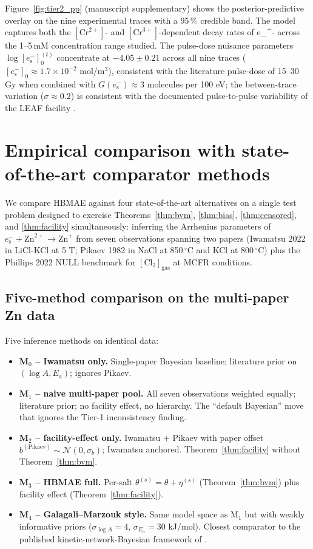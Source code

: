 \documentclass[11pt]{article}
\theoremstyle{definition}
\theoremstyle{remark}
\newcommand{\eS}{e_{\mathrm{s}}^{-}\xspace}
\newcommand{\HBMAE}{HBMAE\xspace}
\begin{document}
Figure~\ref{fig:tier2_pp} (manuscript supplementary) shows the posterior-predictive
overlay on the nine experimental traces with a 95\,\% credible band. The model captures
both the $[\mathrm{Cr}^{2+}]$- and $[\mathrm{Cr}^{3+}]$-dependent decay rates of \eS
across the 1--5\,mM concentration range studied. The pulse-dose nuisance parameters
$\log[\eS]_0^{(t)}$ concentrate at $-4.05 \pm 0.21$ across all nine traces
($[\eS]_0 \approx 1.7\times 10^{-2}$ mol/m$^3$), consistent with the literature pulse-dose
of 15--30 Gy when combined with $G(\eS)\approx 3$ molecules per 100 eV; the
between-trace variation ($\sigma \approx 0.2$) is consistent with the documented pulse-to-pulse
variability of the LEAF facility \citep{Iwamatsu2022}.

\section{Empirical comparison with state-of-the-art comparator methods}\label{sec:comparison}

We compare \HBMAE against four state-of-the-art alternatives on a single test problem
designed to exercise Theorems~\ref{thm:bvm}, \ref{thm:bias}, \ref{thm:censored}, and
\ref{thm:facility} simultaneously: inferring the Arrhenius parameters of
$\eS+\mathrm{Zn}^{2+}\to\mathrm{Zn}^+$ from seven observations spanning two papers
(Iwamatsu 2022 in LiCl-KCl at 5 T; Pikaev 1982 in NaCl at 850\,$^\circ$C and KCl at
800\,$^\circ$C) plus the Phillips 2022 NULL benchmark for $[\mathrm{Cl}_2]_{\mathrm{gas}}$
at MCFR conditions.

\subsection{Five-method comparison on the multi-paper Zn data}\label{sec:zn_comparison}

Five inference methods on identical data:
\begin{itemize}\setlength\itemsep{0pt}
  \item \textbf{M$_0$ -- Iwamatsu only.} Single-paper Bayesian baseline; literature
        prior on $(\log A, E_a)$; ignores Pikaev.
  \item \textbf{M$_1$ -- naive multi-paper pool.} All seven observations weighted
        equally; literature prior; no facility effect, no hierarchy. The ``default
        Bayesian'' move that ignores the Tier-1 inconsistency finding.
  \item \textbf{M$_2$ -- facility-effect only.} Iwamatsu + Pikaev with paper offset
        $b^{(\mathrm{Pikaev})}\sim\mathcal{N}(0,\sigma_b)$; Iwamatsu anchored.
        Theorem~\ref{thm:facility} without Theorem~\ref{thm:bvm}.
  \item \textbf{M$_3$ -- \HBMAE full.} Per-salt $\theta^{(s)} = \theta+\eta^{(s)}$
        (Theorem~\ref{thm:bvm}) plus facility effect (Theorem~\ref{thm:facility}).
  \item \textbf{M$_4$ -- Galagali--Marzouk style.} Same model space as M$_1$ but with
        weakly informative priors ($\sigma_{\log A}=4$, $\sigma_{E_a}=30$ kJ/mol).
        Closest comparator to the published kinetic-network-Bayesian framework
        of \citet{GalagaliMarzouk2015}.
\end{itemize}
\end{document}
